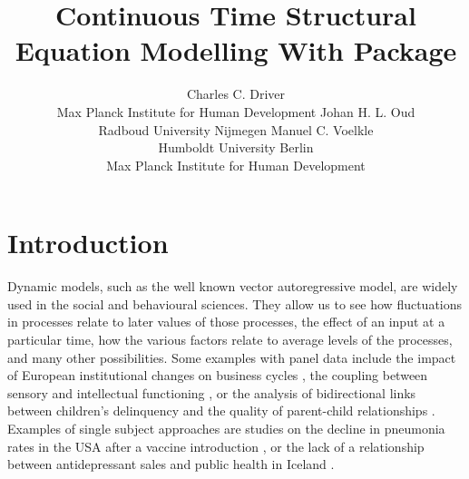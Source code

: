 \documentclass[nojss]{jss}\usepackage[]{graphicx}\usepackage[]{color}
\author{Charles C. Driver \\ Max Planck Institute for Human Development \And 
Johan H. L. Oud \\ Radboud University Nijmegen \AND
Manuel C. Voelkle \\ Humboldt University Berlin \\ Max Planck Institute for Human Development}
\title{Continuous Time Structural Equation Modelling With \proglang{R} Package \pkg{ctsem}}
\begin{document}


\newpage
\section[Introduction]{Introduction}\nopagebreak
Dynamic models, such as the well known vector autoregressive model, are widely used in the social and behavioural sciences. They allow us to see how fluctuations in processes relate to later values of those processes, the effect of an input at a particular time, how the various factors relate to average levels of the processes, and many other possibilities.
Some examples with panel data include the impact of European institutional changes on business cycles \citep{canova2012institutional}, the coupling between sensory and intellectual functioning \citep{ghisletta2005exploring}, or the analysis of bidirectional links between children's delinquency and the quality of parent-child relationships \citep{keijsers2011bidirectional}. 
Examples of single subject approaches are studies on the decline in pneumonia rates in the USA after a vaccine introduction \citep{grijalva2007decline}, or the lack of a relationship between antidepressant sales and public health in Iceland \citep{helgason2004antidepressants}. 
\end{document}
